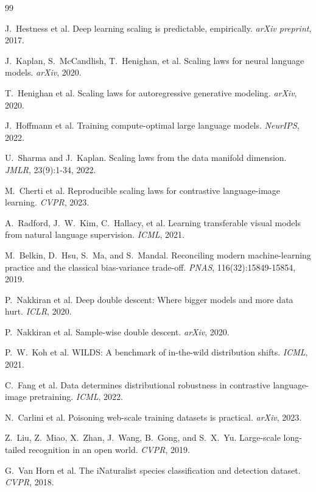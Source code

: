 \documentclass[11pt]{article}
\begin{document}
\begin{thebibliography}{99}

 J.\ Hestness et al. Deep learning scaling is predictable, empirically. \emph{arXiv preprint}, 2017.

 J.\ Kaplan, S.\ McCandlish, T.\ Henighan, et al. Scaling laws for neural language models. \emph{arXiv}, 2020.

 T.\ Henighan et al. Scaling laws for autoregressive generative modeling. \emph{arXiv}, 2020.

 J.\ Hoffmann et al. Training compute-optimal large language models. \emph{NeurIPS}, 2022.

 U.\ Sharma and J.\ Kaplan. Scaling laws from the data manifold dimension. \emph{JMLR}, 23(9):1-34, 2022.

 M.\ Cherti et al. Reproducible scaling laws for contrastive language-image learning. \emph{CVPR}, 2023.

 A.\ Radford, J.\ W.\ Kim, C.\ Hallacy, et al. Learning transferable visual models from natural language supervision. \emph{ICML}, 2021.

 M.\ Belkin, D.\ Hsu, S.\ Ma, and S.\ Mandal. Reconciling modern machine-learning practice and the classical bias-variance trade-off. \emph{PNAS}, 116(32):15849-15854, 2019.

 P.\ Nakkiran et al. Deep double descent: Where bigger models and more data hurt. \emph{ICLR}, 2020.

 P.\ Nakkiran et al. Sample-wise double descent. \emph{arXiv}, 2020.

 P.\ W.\ Koh et al. WILDS: A benchmark of in-the-wild distribution shifts. \emph{ICML}, 2021.

 C.\ Fang et al. Data determines distributional robustness in contrastive language-image pretraining. \emph{ICML}, 2022.

 N.\ Carlini et al. Poisoning web-scale training datasets is practical. \emph{arXiv}, 2023.

 Z.\ Liu, Z.\ Miao, X.\ Zhan, J.\ Wang, B.\ Gong, and S.\ X.\ Yu. Large-scale long-tailed recognition in an open world. \emph{CVPR}, 2019.

 G.\ Van Horn et al. The iNaturalist species classification and detection dataset. \emph{CVPR}, 2018.


\end{thebibliography}
\end{document}
